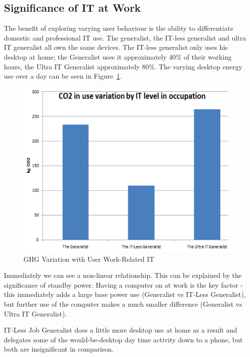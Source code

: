\documentclass[conference]{IEEEtran}
\begin{document}
\subsection{Significance of IT at Work}

The benefit of exploring varying user behaviour is the ability to
differentiate domestic and professional IT use. The generalist, the
IT-less generalist and ultra IT generalist all own the same
devices. The IT-less generalist only uses his desktop at home; the
Generalist uses it approximately 40\% of their working hours, the
Ultra IT Generalist approximately 80\%. The varying desktop energy use
over a day can be seen in Figure~\ref{fig:ghgvariation_userworkrelatedit}.

\begin{figure}[!ht]
\centering
\includegraphics[width=\columnwidth]{images/ghgvariation_userworkrelatedit.png}
\caption{GHG Variation with User Work-Related IT}
\label{fig:ghgvariation_userworkrelatedit} 
\end{figure}

Immediately we can see a non-linear relationship. This can be
explained by the significance of standby power. Having a computer on
at work is the key factor - this immediately adds a large base power
use (Generalist vs IT-Less Generalist), but further use of the
computer makes a much smaller difference (Generalist vs Ultra IT
Generalist).

IT-Less Job Generalist does a little more desktop use at home as a
result and delegates some of the would-be-desktop day time activity
down to a phone, but both are insignificant in comparison.
\end{document}
